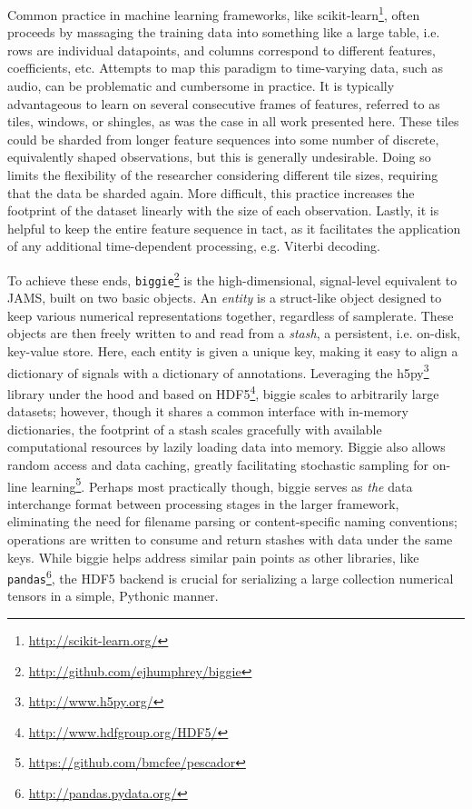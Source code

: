 Common practice in machine learning frameworks, like scikit-learn\footnote{\url{http://scikit-learn.org/}}, often proceeds by massaging the training data into something like a large table, i.e. rows are individual datapoints, and columns correspond to different features, coefficients, etc.
Attempts to map this paradigm to time-varying data, such as audio, can be problematic and cumbersome in practice.
It is typically advantageous to learn on several consecutive frames of features, referred to as tiles, windows, or shingles, as was the case in all work presented here.
These tiles could be sharded from longer feature sequences into some number of discrete, equivalently shaped observations, but this is generally undesirable.
Doing so limits the flexibility of the researcher considering different tile sizes, requiring that the data be sharded again.
More difficult, this practice increases the footprint of the dataset linearly with the size of each observation.
Lastly, it is helpful to keep the entire feature sequence in tact, as it facilitates the application of any additional time-dependent processing, e.g. Viterbi decoding.

To achieve these ends, \texttt{biggie}\footnote{\url{http://github.com/ejhumphrey/biggie}} is the high-dimensional, signal-level equivalent to JAMS, built on two basic objects.
An \emph{entity} is a struct-like object designed to keep various numerical representations together, regardless of samplerate.
These objects are then freely written to and read from a \emph{stash}, a persistent, i.e. on-disk, key-value store.
Here, each entity is given a unique key, making it easy to align a dictionary of signals with a dictionary of annotations.
Leveraging the h5py\footnote{\url{http://www.h5py.org/}} library under the hood and based on HDF5\footnote{\url{http://www.hdfgroup.org/HDF5/}}, biggie scales to arbitrarily large datasets;
however, though it shares a common interface with in-memory dictionaries, the footprint of a stash scales gracefully with available computational resources by lazily loading data into memory.
Biggie also allows random access and data caching, greatly facilitating stochastic sampling for on-line learning\footnote{\url{https://github.com/bmcfee/pescador}}.
Perhaps most practically though, biggie serves as \emph{the} data interchange format between processing stages in the larger framework, eliminating the need for filename parsing or content-specific naming conventions; operations are written to consume and return stashes with data under the same keys.
While biggie helps address similar pain points as other libraries, like \texttt{pandas}\footnote{\url{http://pandas.pydata.org/}}, the HDF5 backend is crucial for serializing a large collection numerical tensors in a simple, Pythonic manner.


